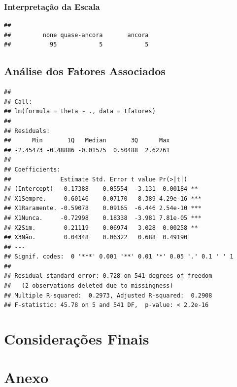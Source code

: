 \documentclass[]{article}
\begin{document}
\subsubsection{Interpretação da Escala}\label{interpretacao-da-escala}

\begin{verbatim}
## 
##         none quase-ancora       ancora 
##           95            5            5
\end{verbatim}

\subsection{Análise dos Fatores
Associados}\label{analise-dos-fatores-associados}

\begin{verbatim}
## 
## Call:
## lm(formula = theta ~ ., data = tfatores)
## 
## Residuals:
##      Min       1Q   Median       3Q      Max 
## -2.45473 -0.48886 -0.01575  0.50488  2.62761 
## 
## Coefficients:
##              Estimate Std. Error t value Pr(>|t|)    
## (Intercept)  -0.17388    0.05554  -3.131  0.00184 ** 
## X1Sempre.     0.60146    0.07170   8.389 4.29e-16 ***
## X1Raramente. -0.59078    0.09165  -6.446 2.54e-10 ***
## X1Nunca.     -0.72998    0.18338  -3.981 7.81e-05 ***
## X2Sim.        0.21119    0.06974   3.028  0.00258 ** 
## X3Não.        0.04348    0.06322   0.688  0.49190    
## ---
## Signif. codes:  0 '***' 0.001 '**' 0.01 '*' 0.05 '.' 0.1 ' ' 1
## 
## Residual standard error: 0.728 on 541 degrees of freedom
##   (2 observations deleted due to missingness)
## Multiple R-squared:  0.2973, Adjusted R-squared:  0.2908 
## F-statistic: 45.78 on 5 and 541 DF,  p-value: < 2.2e-16
\end{verbatim}

\section{Considerações Finais}\label{consideracoes-finais}

\hypertarget{Anexo}{\section{Anexo}\label{Anexo}}


\end{document}
